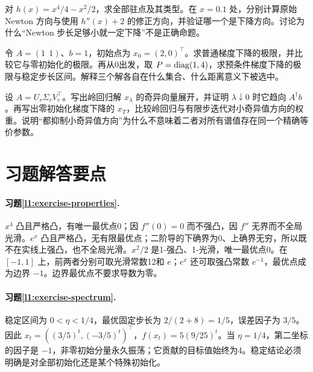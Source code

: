 \begin{exercise}
\label{l1:exercise-newton}
对 $h(x)=x^4/4-x^2/2$，求全部驻点及其类型。在 $x=0.1$ 处，分别计算原始 Newton 方向与使用 $h''(x)+2$ 的修正方向，并验证哪一个是下降方向。讨论为什么“Newton 步长足够小就一定下降”不是正确命题。
\end{exercise}

\begin{exercise}[初始化保留的零空间]
\label{l1:exercise-nullspace}
令 $A=(1\ \ 1)$、$b=1$，初始点为 $x_0=(2,0)^\top$。求普通梯度下降的极限，并比较它与零初始化的极限。再从0出发，取 $P=\operatorname{diag}(1,4)$，求预条件梯度下降的极限与稳定步长区间。解释三个解各自在什么集合、什么距离意义下被选中。
\end{exercise}

\begin{exercise}[选读：正则化极限与早停滤波]
\label{l1:exercise-filters}
设 $A=U_r\Sigma_rV_r^\top$。写出岭回归解 $x_\lambda$ 的奇异向量展开，并证明 $\lambda\downarrow0$ 时它趋向 $A^\dagger b$。再写出零初始化梯度下降的 $x_T$，比较岭回归与有限步迭代对小奇异值方向的权重。说明“都抑制小奇异值方向”为什么不意味着二者对所有谱值存在同一个精确等价参数。
\end{exercise}

\section{习题解答要点}
\label{l1:solutions}

\paragraph{习题\ref{l1:exercise-properties}.}
$x^4$ 凸且严格凸，有唯一最优点0；因 $f''(0)=0$ 而不强凸，因 $f''$ 无界而不全局光滑。$e^x$ 凸且严格凸，无有限最优点；二阶导的下确界为0、上确界无穷，所以既不在实线上强凸，也不全局光滑。$x^2/2$ 是1-强凸、1-光滑，唯一最优点0。在 $[-1,1]$ 上，前两者分别可取光滑常数12和 $e$；$e^x$ 还可取强凸常数 $e^{-1}$，最优点成为边界 $-1$。边界最优点不要求导数为零。

\paragraph{习题\ref{l1:exercise-spectrum}.}
稳定区间为 $0<\eta<1/4$，最优固定步长为 $2/(2+8)=1/5$，误差因子为 $3/5$。因此 $x_t=((3/5)^t,(-3/5)^t)^\top$，$f(x_t)=5(9/25)^t$。当 $\eta=1/4$，第二坐标的因子是 $-1$，非零初始分量永久振荡；它贡献的目标值始终为4。稳定结论必须明确是对全部初始化还是某个特殊初始化。

